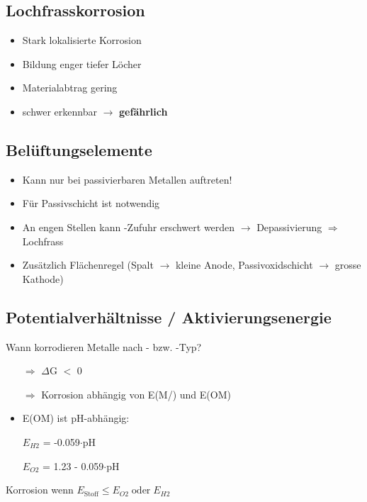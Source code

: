 \subsection{Lochfrasskorrosion}
    \begin{itemize}
        \item Stark lokalisierte Korrosion
        \item Bildung enger tiefer Löcher
        \item Materialabtrag gering
        \item schwer erkennbar $\to$ \textbf{gefährlich}
    \end{itemize}

\subsection{Belüftungselemente}
    \begin{itemize}
        \item Kann nur bei passivierbaren Metallen auftreten!
        \item Für Passivschicht ist  notwendig
        \item An engen Stellen kann -Zufuhr erschwert werden $\rightarrow$ Depassivierung $\Rightarrow$ Lochfrass
        \item Zusätzlich Flächenregel (Spalt $\rightarrow$ kleine Anode, Passivoxidschicht $\rightarrow$ grosse Kathode)
    \end{itemize}

\subsection{Potentialverhältnisse / Aktivierungsenergie}
    Wann korrodieren Metalle nach - bzw. -Typ?

    \begin{itemize}
        \item[$\Rightarrow$] $\Delta$G $<$ 0
        \item[$\Rightarrow$] Korrosion abhängig von E(M/) und E(OM)
        \item E(OM) ist pH-abhängig:
        \item[] $E_{H2}$ = -0.059$\cdot$pH
        \item[] $E_{O2}$ = 1.23 - 0.059$\cdot$pH
    \end{itemize}
Korrosion wenn $E_{\text{Stoff}} \leq  E_{O2}\; \text{oder}\; E_{H2}$